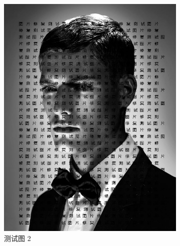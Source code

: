 \documentclass[UTF8]{ctexart}
\begin{document}
\begin{figure}[H]
    \centering
    \begin{subfigure}[b]{0.3\textwidth}
        \includegraphics[width=\textwidth]{test2.jpg} %
        \caption{测试图 2}
        \label{fig:test2}
    \end{subfigure}
    \hfill
    \begin{subfigure}[b]{0.3\textwidth}

\end{subfigure}
\end{figure}
\end{document}
